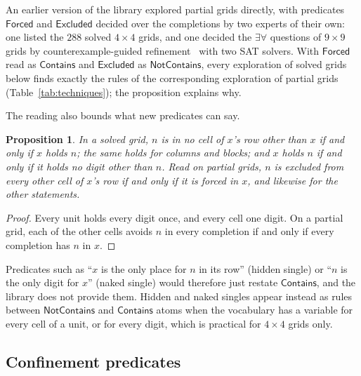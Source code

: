 \documentclass[11pt,a4paper]{article}
\newtheorem{proposition}{Proposition}
\theoremstyle{definition}
\theoremstyle{remark}
\newcommand{\pred}[1]{\mathsf{#1}}
\newcommand{\Contains}{\pred{Contains}}
\newcommand{\NotContains}{\pred{NotContains}}
\begin{document}
An earlier version of the library explored partial grids directly, with predicates $\pred{Forced}$ and $\pred{Excluded}$ decided over the completions by two experts of their own: one listed the $288$ solved $4 \times 4$ grids, and one decided the $\exists\forall$ questions of $9 \times 9$ grids by counterexample-guided refinement~\cite{CGJLV00} with two SAT solvers. With $\pred{Forced}$ read as $\Contains$ and $\pred{Excluded}$ as $\NotContains$, every exploration of solved grids below finds exactly the rules of the corresponding exploration of partial grids (Table~\ref{tab:techniques}); the proposition explains why.

The reading also bounds what new predicates can say.

\begin{proposition}\label{prop:onlyplace}
In a solved grid, $n$ is in no cell of $x$'s row other than $x$ if and only if $x$ holds $n$; the same holds for columns and blocks; and $x$ holds $n$ if and only if it holds no digit other than $n$. Read on partial grids, $n$ is excluded from every other cell of $x$'s row if and only if it is forced in $x$, and likewise for the other statements.
\end{proposition}

\begin{proof}
Every unit holds every digit once, and every cell one digit. On a partial grid, each of the other cells avoids $n$ in every completion if and only if every completion has $n$ in $x$.
\end{proof}

Predicates such as ``$x$ is the only place for $n$ in its row'' (hidden single) or ``$n$ is the only digit for $x$'' (naked single) would therefore just restate $\Contains$, and the library does not provide them. Hidden and naked singles appear instead as rules between $\NotContains$ and $\Contains$ atoms when the vocabulary has a variable for every cell of a unit, or for every digit, which is practical for $4 \times 4$ grids only.

\subsection{Confinement predicates}\label{sec:confined}
\end{document}

